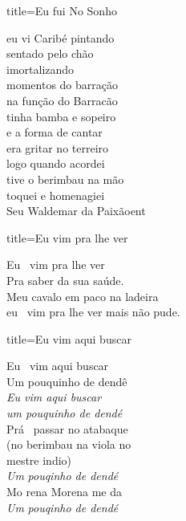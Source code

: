 \documentclass[fontsize=14pt, paper=a4, twoside, DIV=20]{scrreprt} %
\begin{document}
\begin{multicols*}{2}
\begin{song}{title={Eu fui No Sonho}}
\begin{verse*}
            eu vi Caribé pintando\\
            sentado pelo chão\\
            imortalizando\\
            momentos do barração\\

            na função do Barracão\\
            tinha bamba e sopeiro\\
            e a forma de cantar\\
            era gritar no terreiro\\


            logo quando acordei\\
            tive o berimbau na mão\\
            toquei e homenagiei\\
            Seu Waldemar da Paixãoent\\
    \end{verse*}
\end{song}

\begin{song}{title={Eu vim pra lhe ver}}
       \begin{verse*}
           Eu \ vim pra lhe ver\\
            Pra saber da sua saúde.\\
            Meu cavalo em paco na ladeira\\
            eu \ vim pra lhe ver mais não pude.\\
       \end{verse*} 
\end{song}

\begin{song}{title={Eu vim aqui buscar}}
        \begin{verse*}
            Eu \ vim aqui buscar\\
            Um pouquinho de dendê\\
            \textit{Eu vim aqui buscar}\\
            \textit{ um pouquinho de dendé}\\
            Prá \  passar no atabaque \\
            (no berimbau na viola no\\
            mestre indio)\\
            \textit{Um}\textit{ pouqinho de dendé}\\
            Mo rena Morena me da\\
            \textit{Um}\textit{ pouqinho de dendé}\\
        \end{verse*}
\end{song}


\end{multicols*}
\end{document}

